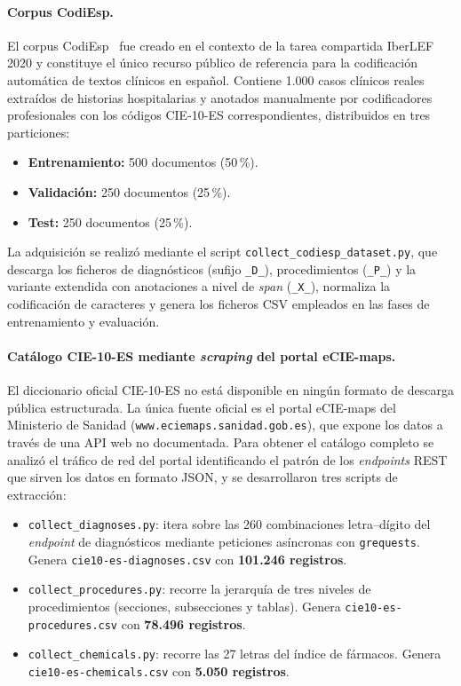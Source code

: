 \paragraph{Corpus CodiEsp.}
El corpus CodiEsp~\cite{miranda2020} fue creado en el contexto de la tarea compartida IberLEF 2020 y constituye el único recurso público de referencia para la codificación automática de textos clínicos en español. Contiene 1.000 casos clínicos reales extraídos de historias hospitalarias y anotados manualmente por codificadores profesionales con los códigos CIE-10-ES correspondientes, distribuidos en tres particiones:

\begin{itemize}
 \item \textbf{Entrenamiento:} 500 documentos (50\,\%).
 \item \textbf{Validación:} 250 documentos (25\,\%).
 \item \textbf{Test:} 250 documentos (25\,\%).
\end{itemize}

La adquisición se realizó mediante el script \texttt{collect\_codiesp\_dataset.py}, que descarga los ficheros de diagnósticos (sufijo \texttt{\_D\_}), procedimientos (\texttt{\_P\_}) y la variante extendida con anotaciones a nivel de \emph{span} (\texttt{\_X\_}), normaliza la codificación de caracteres y genera los ficheros CSV empleados en las fases de entrenamiento y evaluación.

\paragraph{Catálogo CIE-10-ES mediante \emph{scraping} del portal eCIE-maps.}
El diccionario oficial CIE-10-ES no está disponible en ningún formato de descarga pública estructurada. La única fuente oficial es el portal eCIE-maps del Ministerio de Sanidad (\texttt{www.eciemaps.sanidad.gob.es}), que expone los datos a través de una API web no documentada. Para obtener el catálogo completo se analizó el tráfico de red del portal identificando el patrón de los \emph{endpoints} REST que sirven los datos en formato JSON, y se desarrollaron tres scripts de extracción:

\begin{itemize}
 \item \texttt{collect\_diagnoses.py}: itera sobre las 260 combinaciones letra–dígito del \emph{endpoint} de diagnósticos mediante peticiones asíncronas con \texttt{grequests}. Genera \texttt{cie10-es-diagnoses.csv} con \textbf{101.246 registros}.
 \item \texttt{collect\_procedures.py}: recorre la jerarquía de tres niveles de procedimientos (secciones, subsecciones y tablas). Genera \texttt{cie10-es-procedures.csv} con \textbf{78.496 registros}.
 \item \texttt{collect\_chemicals.py}: recorre las 27 letras del índice de fármacos. Genera \texttt{cie10-es-\allowbreak{}chemicals.csv} con \textbf{5.050 registros}.
\end{itemize}

